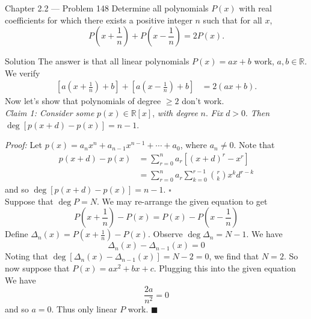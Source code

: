 \documentclass{article}
\begin{document}
\begin{problem}{Chapter 2.2 --- Problem 148}
Determine all polynomials $P(x)$ with real coefficients for which there
exists a positive integer $n$ such that for all $x$,
$$
P\left( x + \frac{1}{n} \right) + P\left( x - \frac{1}{n} \right) = 2P(x).
$$
\end{problem}

\begin{solution}{Solution}
The answer is that all linear polynomials $P(x) = ax + b$ work,
$a,b\in \mathbb{R}$. We verify
\[
\begin{aligned}
\left[ a\left( x + \frac{1}{n} \right) + b \right] +
\left[ a\left( x - \frac{1}{n} \right) + b \right] &=
2(ax + b).
\end{aligned}
\]
Now let's show that polynomials of degree $\geq 2$ don't work. \\

\textit{Claim 1:
Consider some} $p(x) \in \mathbb{R}[x]$, \textit{with degree} $n$.
\textit{Fix} $d > 0$.
\textit{Then} $\deg[p(x+d) - p(x)] = n-1$. \vspace{0.2cm}

\textit{Proof:}
Let
$p(x) = a_n x^n + a_{n-1} x^{n-1} + \cdots + a_0$, where $a_n \neq 0$.
Note that
\[
\begin{aligned}
p(x+d) - p(x) &= \sum_{r=0}^n a_r \left[ (x+d)^r - x^r \right] \\
&= \sum_{r=0}^n a_r \sum_{k=0}^{r-1} \binom{r}{k} x^k d^{r-k}
\end{aligned}
\]
and so $\deg [p(x+d) - p(x)] = n-1$. $\square$
\\

Suppose that $\deg P = N$.
We may re-arrange the given equation to get
$$
P\left( x + \frac{1}{n} \right) - P(x) =
P(x) - P\left( x - \frac{1}{n} \right)
$$
Define $\Delta_n(x) = P\left( x + \frac{1}{n} \right) - P(x)$. Observe
$\deg \Delta_n = N-1$. We have
$$
\Delta_n(x) - \Delta_{n-1}(x) = 0
$$
Noting that $\deg [\Delta_n(x) - \Delta_{n-1}(x)] = N-2 = 0$, we find that
$N = 2$. So now suppose that $P(x) = ax^2 + bx + c$. Plugging this into
the given equation We have
$$
\frac{2a}{n^2} = 0
$$
and so $a=0$. Thus only linear $P$ work. $\blacksquare$
\end{solution}
\end{document}

